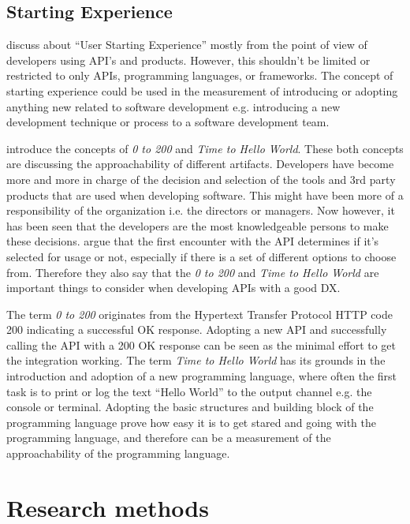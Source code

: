 \documentclass[english, 12pt, a4paper, sci, utf8, a-1b, online]{aaltothesis}
\begin{document}
\subsection{Starting Experience}

\textcite{api-designers} discuss about ``User Starting Experience'' mostly from the point of view of developers using API's and products. However, this shouldn't be limited or restricted to only APIs, programming languages, or frameworks. The concept of starting experience could be used in the measurement of introducing or adopting anything new related to software development e.g. introducing a new development technique or process to a software development team.

\textcite{api-designers} introduce the concepts of \textit{0 to 200} and \textit{Time to Hello World}. These both concepts are discussing the approachability of different artifacts. Developers have become more and more in charge of the decision and selection of the tools and 3rd party products that are used when developing software. This might have been more of a responsibility of the organization i.e. the directors or managers. Now however, it has been seen that the developers are the most knowledgeable persons to make these decisions. \textcite{api-designers} argue that the first encounter with the API determines if it's selected for usage or not, especially if there is a set of different options to choose from. Therefore they also say that the \textit{0 to 200} and \textit{Time to Hello World} are important things to consider when developing APIs with a good DX.

The term \textit{0 to 200} originates from the Hypertext Transfer Protocol HTTP code 200 indicating a successful OK response. Adopting a new API and successfully calling the API with a 200 OK response can be seen as the minimal effort to get the integration working. The term \textit{Time to Hello World} has its grounds in the introduction and adoption of a new programming language, where often the first task is to print or log the text ``Hello World'' to the output channel e.g. the console or terminal. Adopting the basic structures and building block of the programming language prove how easy it is to get stared and going with the programming language, and therefore can be a measurement of the approachability of the programming language.

\clearpage
\section{Research methods} \label{section:research-methods}
\end{document}
